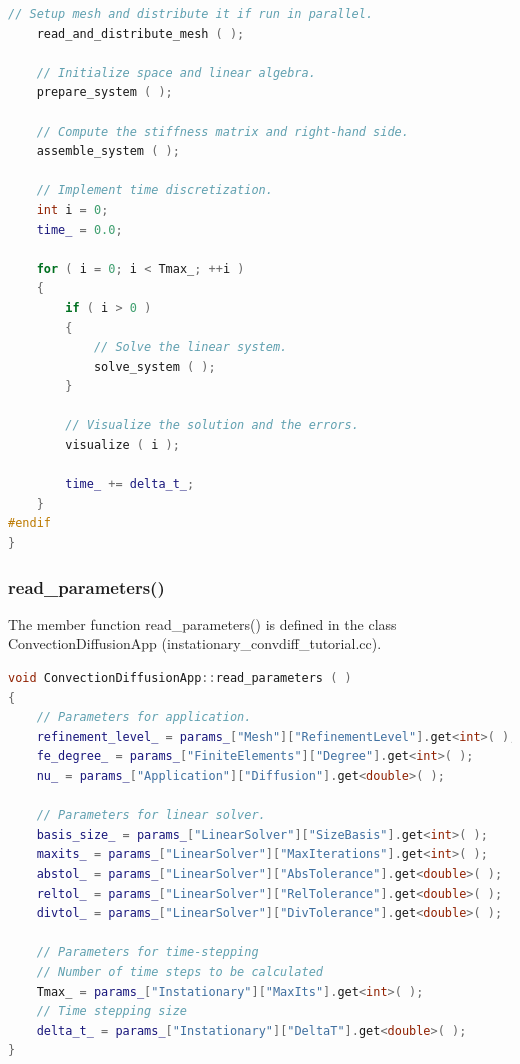 \documentclass[a4paper, 11pt, twoside]{article}
\begin{document}
\begin{lstlisting}[language=C++, basicstyle={\footnotesize, \ttfamily}, keywordstyle=\color{blue}, numbers=none, tabsize=4]
    // Setup mesh and distribute it if run in parallel.
    read_and_distribute_mesh ( );

    // Initialize space and linear algebra.
    prepare_system ( );

    // Compute the stiffness matrix and right-hand side.
    assemble_system ( );

    // Implement time discretization.
    int i = 0;
    time_ = 0.0;

    for ( i = 0; i < Tmax_; ++i )
    {
        if ( i > 0 )
        {
            // Solve the linear system.
            solve_system ( );
        }

        // Visualize the solution and the errors.
        visualize ( i );

        time_ += delta_t_;
    }
#endif
}
\end{lstlisting}

\subsubsection{read\_parameters()}
The member function read\_parameters() is defined in the class ConvectionDiffusionApp (instationary\_convdiff\_tutorial.cc).
\begin{lstlisting}[language=C++, basicstyle={\footnotesize, \ttfamily}, keywordstyle=\color{blue}, numbers=none, tabsize=4]
void ConvectionDiffusionApp::read_parameters ( )
{
    // Parameters for application.
    refinement_level_ = params_["Mesh"]["RefinementLevel"].get<int>( );
    fe_degree_ = params_["FiniteElements"]["Degree"].get<int>( );
    nu_ = params_["Application"]["Diffusion"].get<double>( );

    // Parameters for linear solver.
    basis_size_ = params_["LinearSolver"]["SizeBasis"].get<int>( );
    maxits_ = params_["LinearSolver"]["MaxIterations"].get<int>( );
    abstol_ = params_["LinearSolver"]["AbsTolerance"].get<double>( );
    reltol_ = params_["LinearSolver"]["RelTolerance"].get<double>( );
    divtol_ = params_["LinearSolver"]["DivTolerance"].get<double>( );

    // Parameters for time-stepping
    // Number of time steps to be calculated
    Tmax_ = params_["Instationary"]["MaxIts"].get<int>( );
    // Time stepping size
    delta_t_ = params_["Instationary"]["DeltaT"].get<double>( );
}
\end{lstlisting}
\end{document}
